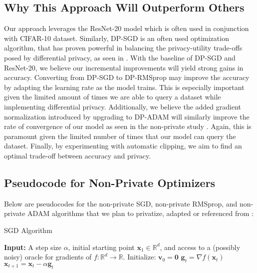 \subsection{Why This Approach Will Outperform Others}\label{subsec:why-this-approach-will-outperform-others}
Our approach leverages the ResNet-20 model which is often used in conjunction with
CIFAR-10 dataset.
Similarly, DP-SGD is an often used optimization algorithm, that has proven powerful in balancing the privacy-utility trade-offs posed
by differential privacy, as seen in \cite{Abadi_2016_DeepLearningDifferentialPrivacy}. With the baseline
of DP-SGD and ResNet-20, we believe our incremental improvements will yield strong gains in
accuracy.
Converting from DP-SGD to DP-RMSprop may improve the accuracy by adapting the learning rate as the
model trains.
This is especially important given the limited amount of times we are able to
query a dataset while implementing differential privacy.
Additionally, we believe the added gradient normalization introduced by upgrading to DP-ADAM will
similarly improve the rate of convergence of our model as seen in the non-private study \cite{DBLP:journals/corr/abs-1807-06766}. Again, this is paramount given the
limited number of times that our model can query the dataset.
Finally, by experimenting with automatic clipping, we aim to
find an optimal trade-off between accuracy and privacy.

\subsection{Pseudocode for Non-Private Optimizers}\label{subsec:pseudo-code-for-non-private-optimizers}
Below are pseudocodes for the non-private SGD, non-private RMSprop, and non-private ADAM algorithms that we plan to privatize, adapted or referenced from \cite{DBLP:journals/corr/abs-1807-06766}:
\begin{algorithm}
    \caption{SGD Algorithm}
    \label{alg:sgd}
    \begin{algorithmic}[1]
        \State \textbf{Input:} A step size $\alpha$, initial starting point $\mathbf{x}_1 \in \mathbb{R}^d$,
        and access to a (possibly noisy) oracle for gradients of $f : \mathbb{R}^d \rightarrow \mathbb{R}$.
            \State Initialize: $\mathbf{v}_0 = \mathbf{0}$
                \State $\mathbf{g}_t = \nabla f(\mathbf{x}_t)$
                \State $\mathbf{x}_{t+1} = \mathbf{x}_t - \alpha \mathbf{g}_t$
            \EndFor
        \EndFunction
    \end{algorithmic}
\end{algorithm}
\vspace{-1cm}

